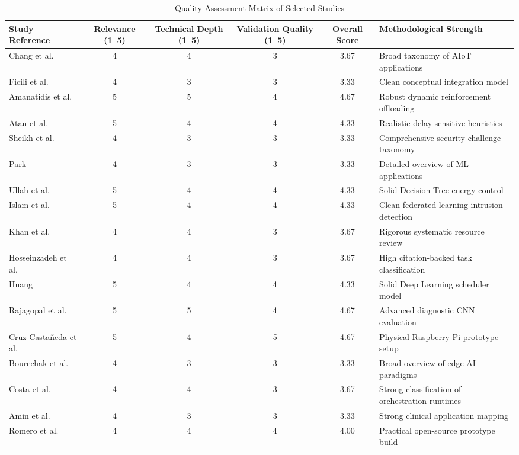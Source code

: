 \documentclass[conference]{IEEEtran}
\begin{document}
\begin{table}[t]
\centering
\caption{Quality Assessment Matrix of Selected Studies}
\label{tab:quality_assessment}
\scriptsize
\begin{tabular}{lccccl}
\toprule
\textbf{Study Reference} & \textbf{Relevance (1--5)} & \textbf{Technical Depth (1--5)} & \textbf{Validation Quality (1--5)} & \textbf{Overall Score} & \textbf{Methodological Strength} \\
\midrule
Chang et al. \cite{b1} & 4 & 4 & 3 & 3.67 & Broad taxonomy of AIoT applications \\
Ficili et al. \cite{b2} & 4 & 3 & 3 & 3.33 & Clean conceptual integration model \\
Amanatidis et al. \cite{b3} & 5 & 5 & 4 & 4.67 & Robust dynamic reinforcement offloading \\
Atan et al. \cite{b4} & 5 & 4 & 4 & 4.33 & Realistic delay-sensitive heuristics \\
Sheikh et al. \cite{b5} & 4 & 3 & 3 & 3.33 & Comprehensive security challenge taxonomy \\
Park \cite{b6} & 4 & 3 & 3 & 3.33 & Detailed overview of ML applications \\
Ullah et al. \cite{b7} & 5 & 4 & 4 & 4.33 & Solid Decision Tree energy control \\
Islam et al. \cite{b8} & 5 & 4 & 4 & 4.33 & Clean federated learning intrusion detection \\
Khan et al. \cite{b9} & 4 & 4 & 3 & 3.67 & Rigorous systematic resource review \\
Hosseinzadeh et al. \cite{b10} & 4 & 4 & 3 & 3.67 & High citation-backed task classification \\
Huang \cite{b11} & 5 & 4 & 4 & 4.33 & Solid Deep Learning scheduler model \\
Rajagopal et al. \cite{b12} & 5 & 5 & 4 & 4.67 & Advanced diagnostic CNN evaluation \\
Cruz Casta\~neda et al. \cite{b13} & 5 & 4 & 5 & 4.67 & Physical Raspberry Pi prototype setup \\
Bourechak et al. \cite{b14} & 4 & 3 & 3 & 3.33 & Broad overview of edge AI paradigms \\
Costa et al. \cite{b15} & 4 & 4 & 3 & 3.67 & Strong classification of orchestration runtimes \\
Amin et al. \cite{b16} & 4 & 3 & 3 & 3.33 & Strong clinical application mapping \\
Romero et al. \cite{b17} & 4 & 4 & 4 & 4.00 & Practical open-source prototype build \\

\end{tabular}
\end{table}
\end{document}

